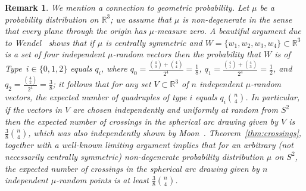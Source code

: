 \documentclass[11pt]{article}
\newtheorem{remark}[theorem]{Remark}
\newcommand{\R}{\mathbb{R}}
\begin{document}
%
\begin{remark} 
\label{rem:Wendel}
We mention a connection to geometric probability. Let $\mu$ be a probability distribution on $\R^3$; we assume that $\mu$ is non-degenerate  in the sense that every plane through the origin has $\mu$-measure zero. A beautiful argument due to Wendel~\cite{Wendel:1962aa} shows that if $\mu$ is \emph{centrally symmetric} and $W=\{w_1,w_2,w_3,w_4\} \subset \R^3$ is a set of four independent $\mu$-random vectors then the probability that $W$ is of Type~$i \in \{0,1,2\}$ equals $q_i$, where  $q_0=\frac{\binom{4}{0}+\binom{4}{4}}{2^4}=\frac{1}{8}$, $q_1=\frac{\binom{4}{1}+\binom{4}{3}}{2^4}=\frac{1}{2}$, and $q_2=\frac{\binom{4}{2}}{2^4}=\frac{3}{8}$;
 it follows that for any set $V\subset \R^3$ of $n$ independent $\mu$-random vectors, the expected number of quadruples of type $i$ equals $q_i \binom{n}{4}$.
 In particular, if the vectors in $V$ are chosen independently and uniformly at random from $S^2$ then the expected number of crossings in the spherical arc drawing given by $V$ is $\frac{3}{8}\binom{n}{4}$, which was also independently shown by Moon~\cite{Moon:1965aa}. Theorem~\ref{thm:crossings}, together with a well-known limiting argument \cite{Scheinerman:1994aa} implies that for an arbitrary (not necessarily centrally symmetric) non-degenerate probability distribution $\mu$ on $S^2$, the expected number of crossings in the spherical arc drawing given by $n$ independent 
 $\mu$-random points is \emph{at least} $\frac{3}{8}\binom{n}{4}$. 
\end{remark}
%
%
\end{document}

